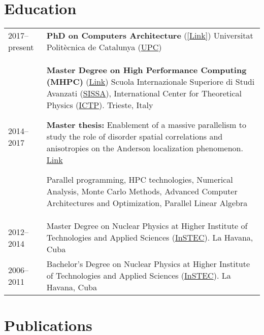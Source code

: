 \documentclass[a4paper,12pt]{article}
\begin{document}
\section{Education}
\begin{tabularx}{\linewidth}{@{}l X@{}}
    2017--present & \textbf{PhD on Computers Architecture} (\href{https://www.ac.upc.edu/en/academics/ph-d/ph-d-programme-by-computer-architecture}{[Link]})
    Universitat Polit\`ecnica de Catalunya (\href{https://www.upc.edu/en}{UPC}) \\

    2014--2017 & \textbf{Master Degree on High Performance Computing (MHPC)} (\href{http://www.mhpc.it}{Link})
    Scuola Internazionale Superiore di Studi Avanzati (\href{https://www.sissa.it/}{SISSA}),
    International Center for Theoretical Physics (\href{https://www.ictp.it/}{ICTP}).
    Trieste, Italy

    \textbf{Master thesis:} Enablement of a massive parallelism to
    study the role of disorder spatial correlations and anisotropies
    on the Anderson localization phenomenon.
    \href{https://backend.mhpc.sissa.it/sites/default/files/2021-02/JimmyAguilarMena.pdf}{Link}

    Parallel programming, HPC technologies, Numerical Analysis, Monte
    Carlo Methods, Advanced Computer Architectures and Optimization,
    Parallel Linear Algebra
    \\

    2012--2014 & Master Degree on Nuclear Physics at Higher Institute of Technologies and Applied Sciences (\href{www.instec.cu}{InSTEC}). La Havana, Cuba \\

    2006--2011 & Bachelor's Degree on Nuclear Physics at Higher Institute of Technologies and Applied Sciences (\href{www.instec.cu}{InSTEC}). La Havana, Cuba \\
\end{tabularx}

\section{Publications}
\begin{refsection}
    \nocite{*}
    \printbibliography[heading=none]
\end{refsection}
\end{document}
